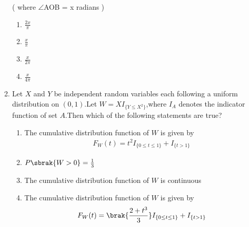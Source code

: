 \begin{enumerate}[label=\thesection.\arabic*.,ref=\thesection.\theenumi]
( where $\angle$AOB = x radians )


    \begin{enumerate}
        \item $\frac{2x}{\pi}$
        \item $\frac{x}{\pi}$
        \item $\frac{x}{2\pi}$
        \item $\frac{x}{4\pi}$
    \end{enumerate}

%
\solution

%
\item Let $X$ and $Y$ be independent random variables each following a uniform distribution on $(0,1)$.Let $W=XI_{\{Y\leq X^2\}}$,where $I_A$ denotes the indicator function of set $A$.Then which of the following statements are true? \\
\begin{enumerate}
\item The cumulative distribution function of $W$ is given by
\begin{align}
  F_W(t)=t^2I_{\{0\leq t \leq 1\}}+ I_{\{t > 1\}}
\end{align}
\item $P\sbrak{W>0}=\frac{1}{3}$
\item The cumulative distribution function of $W$ is continuous
\item The cumulative distribution function of $W$ is given by
\begin{align}
  F_W(t)=\brak{\frac{2+t^3}{3}}I_{\{0\leq t \leq 1\}}+ I_{\{t > 1\}}
\end{align}
\end{enumerate}
%
\solution


\end{enumerate}
